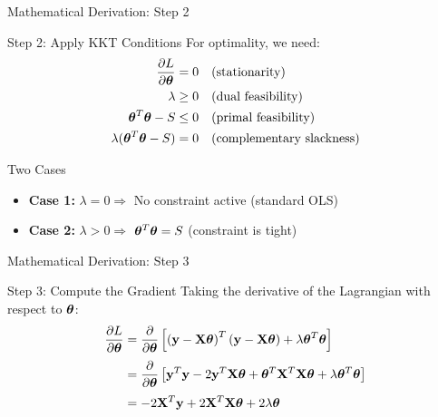 \documentclass{beamer}
\begin{document}
\begin{frame}{Mathematical Derivation: Step 2}
\begin{codebox}{Step 2: Apply KKT Conditions}
For optimality, we need:
\begin{align}
\frac{\partial L}{\partial \boldsymbol{\theta}} &= 0 \quad \text{(stationarity)} \\
\lambda &\geq 0 \quad \text{(dual feasibility)} \\
\boldsymbol{\theta}^T\boldsymbol{\theta} - S &\leq 0 \quad \text{(primal feasibility)} \\
\lambda(\boldsymbol{\theta}^T\boldsymbol{\theta} - S) &= 0 \quad \text{(complementary slackness)}
\end{align}
\end{codebox}
\pause

\begin{keypointsbox}{Two Cases}
\begin{itemize}
\item \textbf{Case 1:} $\lambda = 0 \Rightarrow$ No constraint active (standard OLS)
\item \textbf{Case 2:} $\lambda > 0 \Rightarrow$ $\boldsymbol{\theta}^T\boldsymbol{\theta} = S$ (constraint is tight)
\end{itemize}
\end{keypointsbox}
\end{frame}

\begin{frame}{Mathematical Derivation: Step 3}
\begin{codebox}{Step 3: Compute the Gradient}
Taking the derivative of the Lagrangian with respect to $\boldsymbol{\theta}$:
\begin{align}
\frac{\partial L}{\partial \boldsymbol{\theta}} &= \frac{\partial}{\partial \boldsymbol{\theta}}\left[\left(\mathbf{y}-\mathbf{X}\boldsymbol{\theta}\right)^T\left(\mathbf{y}-\mathbf{X}\boldsymbol{\theta}\right) + \lambda \boldsymbol{\theta}^T\boldsymbol{\theta}\right] \\[0.3em]
&= \frac{\partial}{\partial \boldsymbol{\theta}}\left[\mathbf{y}^T\mathbf{y} - 2\mathbf{y}^T\mathbf{X}\boldsymbol{\theta} + \boldsymbol{\theta}^T\mathbf{X}^T\mathbf{X}\boldsymbol{\theta} + \lambda \boldsymbol{\theta}^T\boldsymbol{\theta}\right] \\[0.3em]
&= -2\mathbf{X}^T\mathbf{y} + 2\mathbf{X}^T\mathbf{X}\boldsymbol{\theta} + 2\lambda\boldsymbol{\theta}
\end{align}
\end{codebox}
\end{frame}
\end{document}
